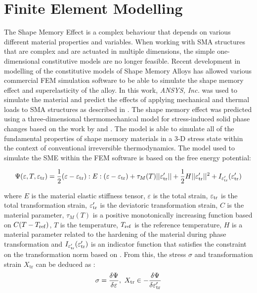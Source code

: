 \section{Finite Element Modelling}
The Shape Memory Effect is a complex behaviour that depends on various different material properties and variables. When working with SMA structures that are complex and are actuated in multiple dimensions, the simple one-dimensional constitutive models are no longer feasible. Recent development in modelling of the constitutive models of Shape Memory Alloys has allowed various commercial FEM simulation software to be able to simulate the shape memory effect and superelasticity of the alloy. In this work, \textit{ANSYS, Inc.} was used to simulate the material and predict the effects of applying mechanical and thermal loads to SMA structures as described in \cite{ansysincNonlinearMaterialProperties2021}. The shape memory effect was predicted using a three-dimensional thermomechanical model for stress-induced solid phase changes based on the work by \cite{auricchioRobustIntegrationalgorithmFinitestrain2001} and \cite{souzaThreedimensionalModelSolids1998}. The model is able to simulate all of the fundamental properties of shape memory materials in a 3-D stress state within the context of conventional irreversible thermodynamics. The model used to simulate the SME within the FEM software is based on the free energy potential:

\begin{equation}
    \label{eq:fem-free-energy}
    \Psi(\varepsilon,T,\varepsilon_\mathrm{tr})=\frac{1}{2}(\varepsilon-\varepsilon_\mathrm{tr}):E:(\varepsilon-\varepsilon_\mathrm{tr})+\tau_M(T)||\varepsilon'_\mathrm{tr}||+\frac{1}{2}H||\varepsilon'_\mathrm{tr}||^2+I_{\varepsilon'_\mathrm{tr}}(\varepsilon'_\mathrm{tr})
\end{equation}

where $E$ is the material elastic stiffness tensor, $\varepsilon$ is the total strain, $\varepsilon_\mathrm{tr}$ is the total transformation strain, $\varepsilon'_\mathrm{tr}$ is the deviatoric transformation strain, $C$ is the material parameter, $\tau_M(T)$ is a positive monotonically increasing function based on $C(T-T_\mathrm{ref})$, $T$ is the temperature, $T_\mathrm{ref}$ is the reference temperature, $H$ is a material parameter related to the hardening of the material during phase transformation and $I_{\varepsilon'_\mathrm{tr}}(\varepsilon'_\mathrm{tr})$ is an indicator function that satisfies the constraint on the transformation norm based on \cite{auricchioImprovementsAlgorithmicalConsiderations2002}. From this, the stress $\sigma$ and transformation strain $X_\mathrm{tr}$ can be deduced as :
\begin{equation}
    \label{eq:fem-stress-transf-stress}
    \sigma = \frac{\delta\Psi}{\delta\varepsilon},~X_\mathrm{tr}\in-\frac{\delta\Psi}{\delta\varepsilon'_\mathrm{tr}}
\end{equation}

